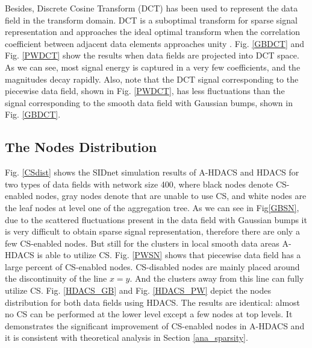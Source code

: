 \documentclass[conference]{IEEEtran}
\begin{document}
Besides, Discrete Cosine Transform (DCT) has been used to represent the data field in the transform domain.
DCT is a suboptimal transform for sparse signal representation and 
approaches the ideal optimal transform when the correlation coefficient between 
adjacent data elements approaches unity \cite{DCT_KL}. Fig. \ref{GBDCT} and Fig. \ref{PWDCT} show the results 
when data fields are projected into DCT space. As we can see, most signal energy is captured in a very 
few coefficients, and the magnitudes decay rapidly. Also, note that the DCT signal corresponding to the piecewise data field, 
shown in Fig. \ref{PWDCT}, has less fluctuations than the signal corresponding to the smooth data field with Gaussian bumps, 
shown in Fig. \ref{GBDCT}. 

\subsection{The Nodes Distribution}
Fig. \ref{CSdist} shows the SIDnet simulation results of A-HDACS and HDACS 
for two types of data fields with network size 400, 
where black nodes denote CS-enabled nodes, gray nodes denote that are unable to use CS, and white nodes are the leaf nodes at level one of the aggregation tree. 
As we can see in Fig\ref{GBSN}, 
due to the scattered fluctuations present in the data field with Gaussian bumps  
it is very difficult to obtain sparse signal representation,  
therefore there are only a few CS-enabled nodes. But still for the clusters in 
local smooth data areas A-HDACS is able to utilize CS. 
Fig. \ref{PWSN} shows that 
piecewise data field has a large percent of CS-enabled nodes.
CS-disabled nodes are mainly placed around the discontinuity of the line $x = y$. And the clusters away from this 
line can fully utilize CS.  Fig. \ref{HDACS_GB} and Fig. \ref{HDACS_PW} depict the nodes distribution for 
both data fields using HDACS. The results are identical: almost no CS can be performed at the lower level 
except a few nodes at top levels. It demonstrates the significant improvement of 
CS-enabled nodes in A-HDACS and it is consistent with theoretical analysis in Section \ref{ana_sparsity}.  

\begin{figure*}
\centering
{}
\qquad
{}
\qquad
{}
\qquad
{}
\caption{The SIDnet simulation results of A-HDACS and HDACS with network size 400: black nodes denote
CS-enabled nodes, gray nodes denote CS-disabled nodes, white nodes are the leaf nodes on level one,
and red node denotes the sink. }
\label{CSdist}
\end{figure*}
\end{document}
